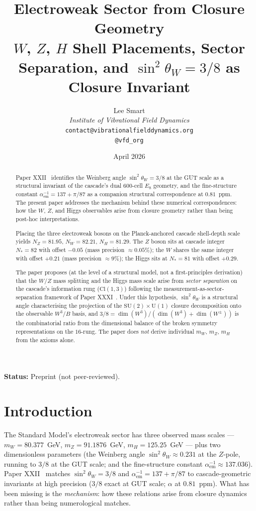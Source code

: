 \documentclass[12pt]{article}
\title{Electroweak Sector from Closure Geometry\\[6pt]
\large $W$, $Z$, $H$ Shell Placements, Sector Separation, and $\sin^2\theta_W = 3/8$ as Closure Invariant}
\author{%
  Lee Smart\\[4pt]
  \textit{Institute of Vibrational Field Dynamics}\\[2pt]
  \texttt{contact@vibrationalfielddynamics.org}\\[2pt]
  \texttt{@vfd\_org}%
}
\date{April 2026}
\theoremstyle{definition}
\theoremstyle{remark}
\begin{document}
\maketitle

\noindent\textbf{Status:} Preprint (not peer-reviewed).

\begin{abstract}
Paper XXII~\citep{SmartXXII} identifies the Weinberg angle $\sin^2\theta_W = 3/8$ at the GUT scale as a structural invariant of the cascade's dual 600-cell $E_8$ geometry, and the fine-structure constant $\alpha_{\mathrm{em}}^{-1} = 137 + \pi/87$ as a companion structural correspondence at $0.81$~ppm. The present paper addresses the mechanism behind these numerical correspondences: how the $W$, $Z$, and Higgs observables arise from closure geometry rather than being post-hoc interpretations.

Placing the three electroweak bosons on the Planck-anchored cascade shell-depth scale yields $N_Z = 81.95$, $N_W = 82.21$, $N_H = 81.29$. The $Z$ boson sits at cascade integer $N_* = 82$ with offset $-0.05$ (mass precision $\approx 0.05\%$); the $W$ shares the same integer with offset $+0.21$ (mass precision $\approx 9\%$); the Higgs sits at $N_* = 81$ with offset $+0.29$.

The paper proposes (at the level of a structural model, not a first-principles derivation) that the $W/Z$ mass splitting and the Higgs mass scale arise from \emph{sector separation} on the cascade's information rung ($\mathrm{Cl}(1,3)$) following the measurement-as-sector-separation framework of Paper XXXI~\citep{SmartXXXI}. Under this hypothesis, $\sin^2\theta_W$ is a structural angle characterising the projection of the $\mathrm{SU}(2) \times \mathrm{U}(1)$ closure decomposition onto the observable $W^3/B$ basis, and $3/8 = \dim(W^3) / (\dim(W^3) + \dim(W^\pm))$ is the combinatorial ratio from the dimensional balance of the broken symmetry representations on the $16$-rung. The paper does \emph{not} derive individual $m_W$, $m_Z$, $m_H$ from the axioms alone.
\end{abstract}

\section{Introduction}\label{sec:intro}

The Standard Model's electroweak sector has three observed mass scales --- $m_W = 80.377$~GeV, $m_Z = 91.1876$~GeV, $m_H = 125.25$~GeV --- plus two dimensionless parameters (the Weinberg angle $\sin^2 \theta_W \approx 0.231$ at the $Z$-pole, running to $3/8$ at the GUT scale; and the fine-structure constant $\alpha_{\mathrm{em}}^{-1} \approx 137.036$). Paper XXII~\citep{SmartXXII} matches $\sin^2 \theta_W = 3/8$ and $\alpha_{\mathrm{em}}^{-1} = 137 + \pi/87$ to cascade-geometric invariants at high precision ($3/8$ exact at GUT scale; $\alpha$ at $0.81$~ppm). What has been missing is the \emph{mechanism}: how these relations arise from closure dynamics rather than being numerological matches.
\end{document}
